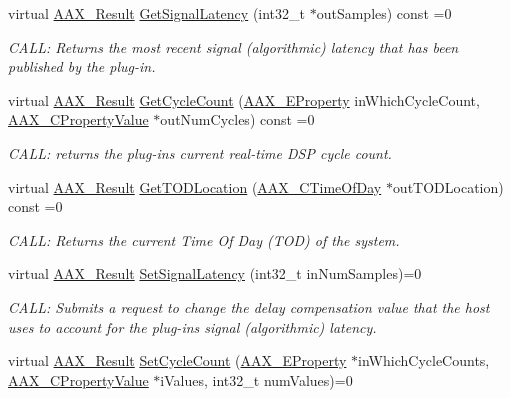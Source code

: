 \begin{DoxyCompactItemize}
virtual \hyperlink{a00149_a4d8f69a697df7f70c3a8e9b8ee130d2f}{A\+A\+X\+\_\+\+Result} \hyperlink{a00053_ae4a19f971e0884aee6802ef0b3e0a020}{Get\+Signal\+Latency} (int32\+\_\+t $\ast$out\+Samples) const =0
\begin{DoxyCompactList}\small\item\em C\+A\+L\+L\+: Returns the most recent signal (algorithmic) latency that has been published by the plug-\/in. \end{DoxyCompactList}\item 
virtual \hyperlink{a00149_a4d8f69a697df7f70c3a8e9b8ee130d2f}{A\+A\+X\+\_\+\+Result} \hyperlink{a00053_a37c235cb6a27eab95686a009edeffabe}{Get\+Cycle\+Count} (\hyperlink{a00283_a6571f4e41a5dd06e4067249228e2249e}{A\+A\+X\+\_\+\+E\+Property} in\+Which\+Cycle\+Count, \hyperlink{a00149_ab247c0d8686c14e05cbb567ef276f249}{A\+A\+X\+\_\+\+C\+Property\+Value} $\ast$out\+Num\+Cycles) const =0
\begin{DoxyCompactList}\small\item\em C\+A\+L\+L\+: returns the plug-\/in\textquotesingle{}s current real-\/time D\+S\+P cycle count. \end{DoxyCompactList}\item 
virtual \hyperlink{a00149_a4d8f69a697df7f70c3a8e9b8ee130d2f}{A\+A\+X\+\_\+\+Result} \hyperlink{a00053_af34fa72c0e4043d5746adcf54e2299d7}{Get\+T\+O\+D\+Location} (\hyperlink{a00149_a46542a1dcccdcc3b4260a9926edf8a2a}{A\+A\+X\+\_\+\+C\+Time\+Of\+Day} $\ast$out\+T\+O\+D\+Location) const =0
\begin{DoxyCompactList}\small\item\em C\+A\+L\+L\+: Returns the current Time Of Day (T\+O\+D) of the system. \end{DoxyCompactList}\item 
virtual \hyperlink{a00149_a4d8f69a697df7f70c3a8e9b8ee130d2f}{A\+A\+X\+\_\+\+Result} \hyperlink{a00053_aee931a52f15789d1b6a4e78cfd4f4961}{Set\+Signal\+Latency} (int32\+\_\+t in\+Num\+Samples)=0
\begin{DoxyCompactList}\small\item\em C\+A\+L\+L\+: Submits a request to change the delay compensation value that the host uses to account for the plug-\/in\textquotesingle{}s signal (algorithmic) latency. \end{DoxyCompactList}\item 
virtual \hyperlink{a00149_a4d8f69a697df7f70c3a8e9b8ee130d2f}{A\+A\+X\+\_\+\+Result} \hyperlink{a00053_a452f047d471518a0ff5221887fd387df}{Set\+Cycle\+Count} (\hyperlink{a00283_a6571f4e41a5dd06e4067249228e2249e}{A\+A\+X\+\_\+\+E\+Property} $\ast$in\+Which\+Cycle\+Counts, \hyperlink{a00149_ab247c0d8686c14e05cbb567ef276f249}{A\+A\+X\+\_\+\+C\+Property\+Value} $\ast$i\+Values, int32\+\_\+t num\+Values)=0

\end{DoxyCompactItemize}
